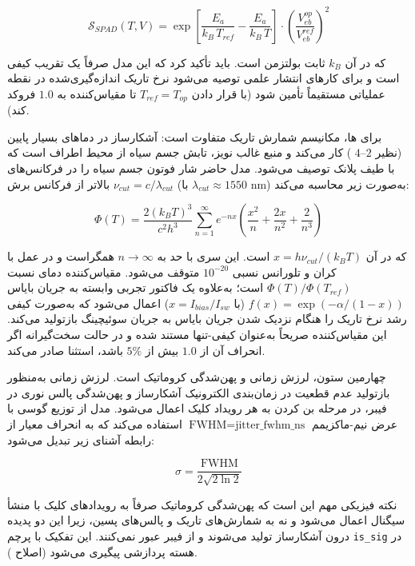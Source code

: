 \begin{equation}
	\mathcal{S}_{SPAD}(T, V) = \exp\!\left[\frac{E_a}{k_B\,T_{ref}} - \frac{E_a}{k_B\,T}\right] \cdot \left(\frac{V_{eb}^{op}}{V_{eb}^{ref}}\right)^{2}
\end{equation}

که در آن $k_B$ ثابت بولتزمن است. باید تأکید کرد که این مدل صرفاً یک تقریب کیفی است و برای کارهای انتشار علمی توصیه می‌شود نرخ تاریک اندازه‌گیری‌شده در نقطه عملیاتی مستقیماً تأمین شود (با قرار دادن $T_{ref}=T_{op}$ تا مقیاس‌کننده به $1.0$ فروکد کند).

برای ها، مکانیسم شمارش تاریک متفاوت است: آشکارساز در دماهای بسیار پایین (نظیر $2$--$4$ ) کار می‌کند و منبع غالب نویز، تابش جسم سیاه  از محیط اطراف است که با طیف پلانک توصیف می‌شود. مدل حاضر شار فوتون جسم سیاه را در فرکانس‌های بالاتر از فرکانس برش $\nu_{cut} = c/\lambda_{cut}$ (با $\lambda_{cut}\approx 1550$ nm) به‌صورت زیر محاسبه می‌کند:

\begin{equation}
	\Phi(T) = \frac{2(k_B T)^3}{c^2 h^3} \sum_{n=1}^{\infty} e^{-nx}\left(\frac{x^2}{n} + \frac{2x}{n^2} + \frac{2}{n^3}\right)
\end{equation}

که در آن $x = h\nu_{cut}/(k_B T)$ است. این سری با حد به $n \to \infty$ همگراست و در عمل با کران  و تلورانس نسبی $10^{-20}$ متوقف می‌شود. مقیاس‌کننده دمای  نسبت $\Phi(T)/\Phi(T_{ref})$ است؛ به‌علاوه یک فاکتور تجربی وابسته به جریان بایاس $f(x) = \exp(-\alpha/(1-x))$ (با $x = I_{bias}/I_{sw}$) اعمال می‌شود که به‌صورت کیفی رشد نرخ تاریک را هنگام نزدیک شدن جریان بایاس به جریان سوئیچینگ بازتولید می‌کند. این مقیاس‌کننده صریحاً به‌عنوان کیفی-تنها  مستند شده و در حالت سخت‌گیرانه اگر انحراف آن از $1.0$ بیش از $5\%$ باشد، استثنا صادر می‌کند.

چهارمین ستون، لرزش زمانی  و پهن‌شدگی کروماتیک  است. لرزش زمانی به‌منظور بازتولید عدم قطعیت در زمان‌بندی الکترونیک آشکارساز و پهن‌شدگی پالس نوری در فیبر، در مرحله بن کردن  به هر رویداد کلیک اعمال می‌شود. مدل از توزیع گوسی با عرض نیم-ماکزیمم $\text{FWHM} = \text{jitter\_fwhm\_ns}$ استفاده می‌کند که به انحراف معیار از رابطه آشنای زیر تبدیل می‌شود:

\begin{equation}
	\sigma = \frac{\text{FWHM}}{2\sqrt{2\ln 2}}
\end{equation}

نکته فیزیکی مهم این است که پهن‌شدگی کروماتیک صرفاً به رویدادهای کلیک با منشأ سیگنال اعمال می‌شود و نه به شمارش‌های تاریک و پالس‌های پسین، زیرا این دو پدیده درون آشکارساز تولید می‌شوند و از فیبر عبور نمی‌کنند. این تفکیک با پرچم \texttt{is\_sig} در هسته پردازشی پیگیری می‌شود (اصلاح ).

